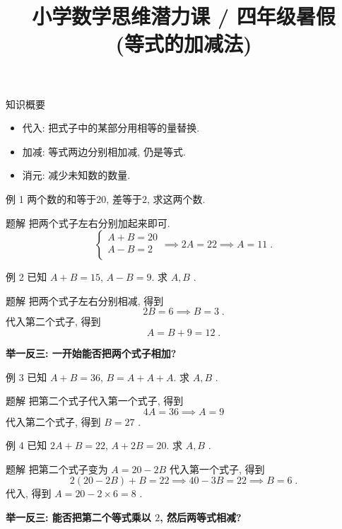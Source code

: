 \documentclass[content.tex]{subfiles}
\title{小学数学思维潜力课 / 四年级暑假 \\ (等式的加减法)}
\begin{document}
\begin{frame}
\maketitle
\end{frame}

\begin{frame}{知识概要}
\begin{itemize}
\item 代入: 把式子中的某部分用相等的量替换.
\item 加减: 等式两边分别相加减, 仍是等式.
\item 消元: 减少未知数的数量.
\end{itemize}
\end{frame}

\begin{frame}{例 1}
两个数的和等于$20$, 差等于$2$, 求这两个数.
\begin{exampleblock}{题解}
把两个式子左右分别加起来即可.
$$
\begin{cases}
A+B=20\\
A-B=2\\
\end{cases}
\implies 2A=22
\implies A=11\;.
$$
\end{exampleblock}
\end{frame}

\begin{frame}{例 2}
已知 $A + B = 15$, $A - B = 9$. 求 $A,B$ .
\begin{exampleblock}{题解}
把两个式子左右分别相减, 得到
$$2B = 6 \implies B = 3\;.$$
代入第二个式子, 得到
$$A = B + 9 = 12\;.$$
\end{exampleblock}
\textbf{举一反三: 一开始能否把两个式子相加?}
\end{frame}

\begin{frame}{例 3}
已知 $A + B = 36$, $B = A + A + A$. 求 $A,B$ .
\begin{exampleblock}{题解}
把第二个式子代入第一个式子, 得到
$$
4A = 36 \implies A = 9
$$
代入第二个式子, 得到 $B = 27$ . 
\end{exampleblock}
\end{frame}

\begin{frame}{例 4}
已知 $2A+B=22$, $A+2B=20$. 求 $A,B$ .
\begin{exampleblock}{题解}
把第二个式子变为 $A=20-2B$ 代入第一个式子, 得到
$$2(20-2B)+B=22\implies 40-3B=22\implies B=6\;.$$
代入, 得到 $A=20-2\times6=8$ . 
\end{exampleblock}
\textbf{举一反三: 能否把第二个等式乘以 $2$, 然后两等式相减? }
\end{frame}
\end{document}
